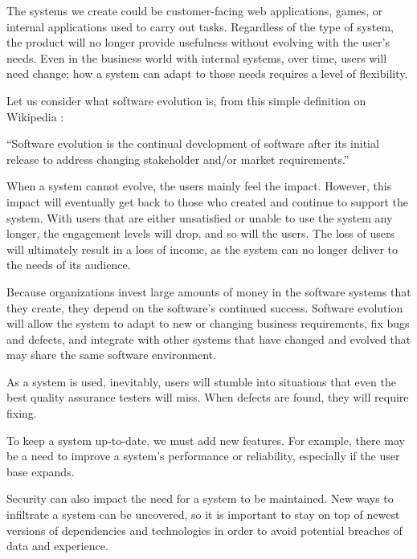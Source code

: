\documentclass[12pt,conference]{IEEEtran}
\begin{document}
The systems we create could be customer-facing web applications, games, or internal applications used to carry out tasks. Regardless of the type of system, the product will no longer provide usefulness without evolving with the user's needs. Even in the business world with internal systems, over time, users will need change; how a system can adapt to those needs requires a level of flexibility.

Let us consider what software evolution is, from this simple definition on Wikipedia \cite{wiki:software-evolution}:

\vspace{0.25cm}

\begin{displayquote}
``Software evolution is the continual development of software after its initial release to address changing stakeholder and/or market requirements.''
\end{displayquote}

\vspace{0.25cm}


When a system cannot evolve, the users mainly feel the impact. However, this impact will eventually get back to those who created and continue to support the system. With users that are either unsatisfied or unable to use the system any longer, the engagement levels will drop, and so will the users. The loss of users will ultimately result in a loss of income, as the system can no longer deliver to the needs of its audience.

Because organizations invest large amounts of money in the software systems that they create, they depend on the software's continued success. Software evolution will allow the system to adapt to new or changing business requirements, fix bugs and defects, and integrate with other systems that have changed and evolved that may share the same software environment.

As a system is used, inevitably, users will stumble into situations that even the best quality assurance testers will miss. When defects are found, they will require fixing. 

To keep a system up-to-date, we must add new features. For example, there may be a need to improve a system's performance or reliability, especially if the user base expands.

Security can also impact the need for a system to be maintained. New ways to infiltrate a system can be uncovered, so it is important to stay on top of newest versions of dependencies and technologies in order to avoid potential breaches of data and experience.
\end{document}
